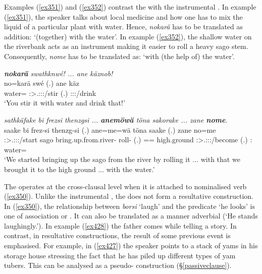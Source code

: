 Examples (\ref{ex351}) and (\ref{ex352}) contrast the   with the instrumental . In example (\ref{ex351}), the speaker talks about local medicine and how one has to mix the liquid of a particular plant with water. Hence, \emph{nokarä} has to be translated as addition: `(together) with the water'. In example (\ref{ex352}), the shallow water on the riverbank acts as an instrument making it easier to roll a heavy sago stem. Consequently, \emph{nome} has to be translated as: `with (the help of) the water'.

\begin{exe}
	\ex \emph{\textbf{nokarä} swathknwé! ... ane käznob!}\\
	\gll no=karä swé (.) ane käz\\
	water=\Prop{} \Ssg:\Sbj>\Tsg.\Masc:\Obj:\Imp:\Ipfv/stir (.) \Dem{} \Ssg:\Sbj:\Imp:\Pfv/drink\\
	\trans `You stir it with water and drink that!'
	\label{ex351}
\end{exe}
\begin{exe}
	\ex \emph{sathkäfake bi frezsi thenzgsi ... \textbf{anemöwä} töna sakorake ... zane \textbf{nome}.}\\
	\gll saake bi frez-si thenzg-si (.) ane=me=wä töna saake (.) zane no=me\\
	\Fpl:\Sbj>\Tsg.\Masc:\Obj:\Pst:\Pfv/start sago bring.up.from.river-\Nmlz{} roll-\Nmlz{} (.) \Dem=\Ins=\Emph{} high.ground \Fpl:\Sbj>\Tsg.\Masc:\Obj:\Pst:\Pfv/become (.) \Dem:\Prox{} water=\Ins{}\\
	\trans `We started bringing up the sago from the river by rolling it ... with that we brought it to the high ground ... with the water.'\\
	\label{ex352}
\end{exe}

The   operates at the cross-clausal level when it is attached to nominalised verb (\ref{ex350}). Unlike the instrumental , the  does not form a resultative construction. In (\ref{ex350}), the relationship between \emph{borsi} `laugh' and the predicate `he looks' is one of association or . It can also be translated as a manner adverbial (`He stands laughingly.'). In example (\ref{ex428}) the father comes while telling a story. In contrast, in resultative constructions, the result of some previous event is emphasised. For example, in (\ref{ex427}) the speaker points to a stack of yams in his storage house stressing the fact that he has piled up different types of yam tubers. This can be analysed as a pseudo- construction (\S{}\ref{passiveclause}).
	
